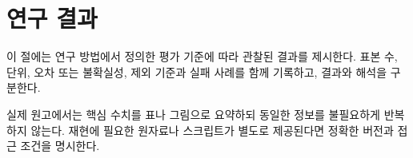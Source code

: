 \section{연구 결과}

이 절에는 연구 방법에서 정의한 평가 기준에 따라 관찰된 결과를 제시한다. 표본 수, 단위, 오차 또는 불확실성, 제외 기준과 실패 사례를 함께 기록하고, 결과와 해석을 구분한다.

실제 원고에서는 핵심 수치를 표나 그림으로 요약하되 동일한 정보를 불필요하게 반복하지 않는다. 재현에 필요한 원자료나 스크립트가 별도로 제공된다면 정확한 버전과 접근 조건을 명시한다.
